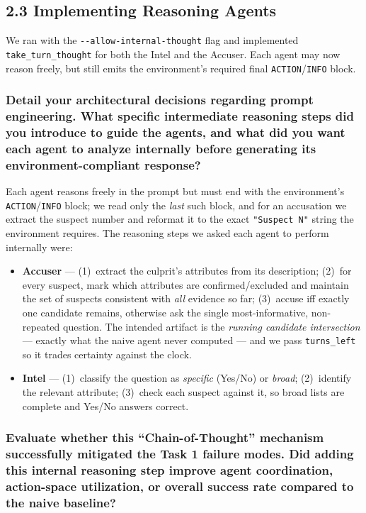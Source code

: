 \documentclass[11pt]{article}
\begin{document}
\subsection*{2.3 \quad Implementing Reasoning Agents}

We ran with the \texttt{-{}-allow-\allowbreak internal-\allowbreak thought} flag and
implemented \texttt{take\_turn\_thought} for both the Intel and the Accuser. Each agent may
now reason freely, but still emits the environment's required final
\texttt{ACTION}/\texttt{INFO} block.

\subsubsection*{Detail your architectural decisions regarding prompt engineering. What specific
intermediate reasoning steps did you introduce to guide the agents, and what did you want
each agent to analyze internally before generating its environment-compliant response?}

Each agent reasons freely in the prompt but must end with the environment's
\texttt{ACTION}/\texttt{INFO} block; we read only the \emph{last} such block, and for an
accusation we extract the suspect number and reformat it to the exact \texttt{"Suspect N"}
string the environment requires.
The reasoning steps we asked each agent to perform internally were:
\begin{itemize}[leftmargin=1.4em,itemsep=2pt]
  \item \textbf{Accuser} --- (1)~extract the culprit's attributes from its description;
  (2)~for every suspect, mark which attributes are confirmed/excluded and maintain the set of
  suspects consistent with \emph{all} evidence so far; (3)~accuse iff exactly one candidate
  remains, otherwise ask the single most-informative, non-repeated question. The intended
  artifact is the \emph{running candidate intersection} --- exactly what the naive agent
  never computed --- and we pass \texttt{turns\_left} so it trades certainty against the clock.
  \item \textbf{Intel} --- (1)~classify the question as \emph{specific} (Yes/No) or
  \emph{broad}; (2)~identify the relevant attribute; (3)~check each suspect against it, so
  broad lists are complete and Yes/No answers correct.
\end{itemize}

\subsubsection*{Evaluate whether this ``Chain-of-Thought'' mechanism successfully mitigated the
Task 1 failure modes. Did adding this internal reasoning step improve agent coordination,
action-space utilization, or overall success rate compared to the naive baseline?}
\end{document}
